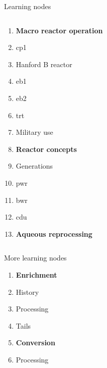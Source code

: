 \documentclass[aspectratio=1610,pdftex,dvipsnames,compress,xcolor={dvipsnames}]{beamer}
\newcommand{\acs}{\acrshort} %
\begin{document}
\begin{frame}{Learning nodes}
\begin{columns}[t]
        \begin{column}{0.50\textwidth}
            \begin{enumerate}[series=outerlist,topsep=0pt,itemsep=1pt,leftmargin=*,label=(\arabic*)]
                \item[]\hfill\textbf{Macro reactor operation}
                \item[]\hfill \acs{cp1}
                \item[]\hfill Hanford B reactor
                \item[]\hfill \acs{eb1}
                \item[]\hfill \acs{eb2}
                \item[]\hfill \acs{trt} 
                \item[]\hfill Military use
                    \vspace{0.15in}
                \item[]\hfill\textbf{Reactor concepts}
                \item[]\hfill Generations
                \item[]\hfill \acs{pwr}
                \item[]\hfill \acs{bwr}
                \item[]\hfill \acs{cdu}
                    \vspace{0.15in}
                \item[]\hfill\textbf{Aqueous reprocessing}
            \end{enumerate}
        \end{column}

    \end{columns}
\end{frame}


\begin{frame}{More learning nodes}
    \begin{enumerate}[series=outerlist,topsep=0pt,itemsep=1pt,leftmargin=*,label=(\arabic*)]
        \item[]\textbf{Enrichment}
        \item[]History
        \item[]Processing
        \item[]Tails
            \vspace{0.15in}
        \item[]\textbf{Conversion}
        \item[]Processing
    \end{enumerate}
\end{frame}
\end{document}
